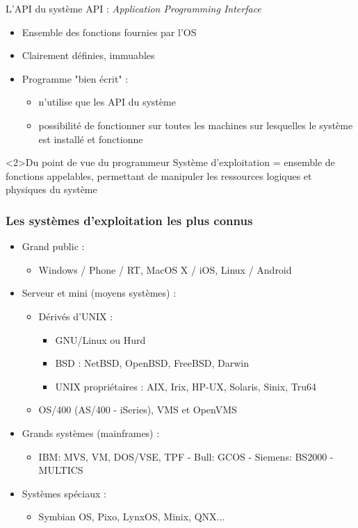 \begin{frame}{L'API du système}
API : \textit{Application Programming Interface}
\begin{itemize}
\item Ensemble des fonctions fournies par l'OS
\item Clairement définies, immuables
\item Programme "bien écrit" :
\begin{itemize}
\item n'utilise que les API du système
\item possibilité de fonctionner sur toutes les machines sur lesquelles le système est installé et fonctionne
\end{itemize}
\end{itemize}
\begin{block}<2>{Du point de vue du programmeur}
Système d'exploitation = ensemble de fonctions appelables, permettant de manipuler les ressources logiques et physiques du système
\end{block}
\end{frame}


\begin{frame}
\frametitle{Les systèmes d'exploitation les plus connus}
\begin{itemize}
\item Grand public :
\begin{itemize}
\item Windows / Phone / RT, MacOS X / iOS, Linux / Android
\end{itemize}
\item Serveur et mini (moyens systèmes) :
\begin{itemize}
\item Dérivés d'UNIX :
\begin{itemize}
\item GNU/Linux ou Hurd
\item BSD : NetBSD, OpenBSD, FreeBSD, Darwin
\item UNIX propriétaires : AIX, Irix, HP-UX, Solaris, Sinix, Tru64
\end{itemize}
\item OS/400 (AS/400 - iSeries), VMS et OpenVMS
\end{itemize}
\item Grands systèmes (mainframes) :
\begin{itemize}
\item IBM: MVS, VM, DOS/VSE, TPF - Bull: GCOS - Siemens: BS2000 - MULTICS
\end{itemize}
\item Systèmes spéciaux :
\begin{itemize}
\item Symbian OS, Pixo, LynxOS, Minix, QNX...
\end{itemize}
\end{itemize}
\end{frame}


